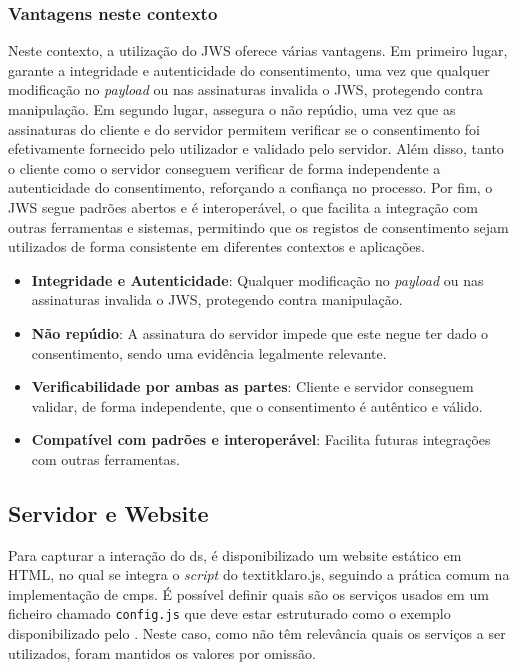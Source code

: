 \subsubsection{Vantagens neste contexto}

Neste contexto, a utilização do JWS oferece várias vantagens. Em primeiro lugar, garante a integridade e autenticidade do consentimento, uma vez que qualquer modificação no \textit{payload} ou nas assinaturas invalida o JWS, protegendo contra manipulação. 
Em segundo lugar, assegura o não repúdio, uma vez que as assinaturas do cliente e do servidor permitem verificar se o consentimento foi efetivamente fornecido pelo utilizador e validado pelo servidor.
Além disso, tanto o cliente como o servidor conseguem verificar de forma independente a autenticidade do consentimento, reforçando a confiança no processo.
Por fim, o JWS segue padrões abertos e é interoperável, o que facilita a integração com outras ferramentas e sistemas, permitindo que os registos de consentimento sejam utilizados de forma consistente em diferentes contextos e aplicações.

\begin{itemize}
  \item \textbf{Integridade e Autenticidade}: Qualquer modificação no \textit{payload} ou nas assinaturas invalida o JWS, protegendo contra manipulação.
  \item \textbf{Não repúdio}: A assinatura do servidor impede que este negue ter dado o consentimento, sendo uma evidência legalmente relevante.
  \item \textbf{Verificabilidade por ambas as partes}: Cliente e servidor conseguem validar, de forma independente, que o consentimento é autêntico e válido.
  \item \textbf{Compatível com padrões e interoperável}: Facilita futuras integrações com outras ferramentas.
\end{itemize}


\subsection{Servidor e Website}

Para capturar a interação do \acrshort{ds}, é disponibilizado um website estático em HTML, no qual se integra o \textit{script} do textit{klaro.js}, seguindo a prática comum na implementação de \acrshort{cmp}s.
É possível definir quais são os serviços usados em um ficheiro chamado \texttt{config.js} que deve estar estruturado como o exemplo disponibilizado pelo \cite{gitklaro}. Neste caso, como não têm relevância quais os serviços a ser utilizados, foram mantidos os valores por omissão.

